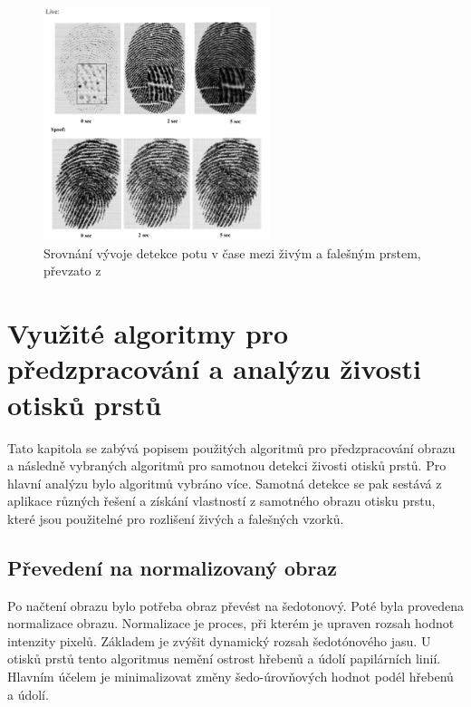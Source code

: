 \begin{figure}[!htbp]
    \centering
    \includegraphics[width=250px]{obrazky-figures/pores.png}
    \caption{Srovnání vývoje detekce potu v čase mezi živým a falešným prstem, převzato z \cite{PoresResearch}}
\end{figure}




\chapter{Využité algoritmy pro předzpracování a analýzu živosti otisků prstů}
Tato kapitola se zabývá popisem použitých algoritmů pro předzpracování obrazu a následně vybraných algoritmů pro samotnou detekci živosti otisků prstů. Pro hlavní analýzu bylo algoritmů vybráno více. Samotná detekce se pak sestává z aplikace různých řešení a získání vlastností z samotného obrazu otisku prstu, které jsou použitelné pro rozlišení živých a falešných vzorků.
\section{Převedení na normalizovaný obraz}
Po načtení obrazu bylo potřeba obraz převést na šedotonový. Poté byla provedena normalizace obrazu. Normalizace je proces, při kterém je upraven rozsah hodnot intenzity pixelů. Základem je zvýšit dynamický rozsah šedotónového jasu. U otisků prstů tento algoritmus nemění ostrost hřebenů a údolí papilárních linií. Hlavním účelem je minimalizovat změny šedo-úrovňových hodnot podél hřebenů a údolí. 


